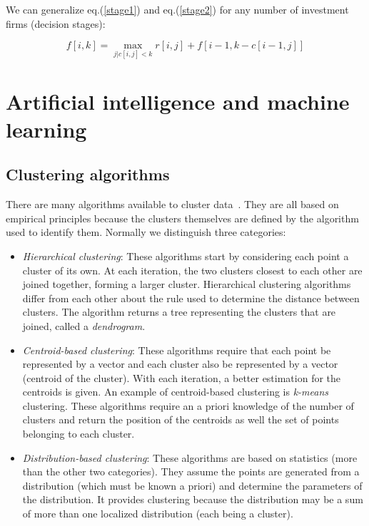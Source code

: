 \documentclass[justified, sixbynine]{tufte-book}
\theoremstyle{plain}%
\newtheorem * {corollary}{Corollary}
\theoremstyle{definition}
\theoremstyle{remark}
\newtheorem * {remark}{Remark}
\newtheorem * {note}{Note}
\begin{document}
\begin{fullwidth}
We can generalize eq.(\ref{stage1}) and eq.(\ref{stage2}) for any number of
investment firms (decision stages):

\begin{equation}
f[i, k]=\max_{j|c[i, j]<k}r[i, j]+f[i-1, k-c[i-1, j]]
\end{equation}

\goodbreak\section{Artificial intelligence and machine learning}


\goodbreak\subsection{Clustering algorithms}


There are many algorithms available to cluster data~\cite{clustering}. They are all based on empirical principles because the clusters themselves are defined by the algorithm used to identify them. Normally we distinguish three categories:
\begin{itemize}
\item {\it Hierarchical clustering}: These algorithms start by considering each point a cluster of its own. At each iteration, the two clusters closest to each other are joined together, forming a larger cluster. Hierarchical clustering algorithms differ from each other about the rule used to determine the distance between clusters. The algorithm returns a tree representing the clusters that are joined, called a {\it dendrogram}.
\item {\it Centroid-based clustering}: These algorithms require that each point be represented by a vector and each cluster also be represented by a vector (centroid of the cluster). With each iteration, a better estimation for the centroids is given. An example of centroid-based clustering is {\it k-means} clustering. These algorithms require an a priori knowledge of the number of clusters and return the position of the centroids as well the set of points belonging to each cluster.
\item {\it Distribution-based clustering}: These algorithms are based on statistics (more than the other two categories). They assume the points are generated from a distribution (which must be known a priori) and determine the parameters of the distribution. It provides clustering because the distribution may be a sum of more than one localized distribution (each being a cluster).
\end{itemize}


\end{fullwidth}
\end{document}
